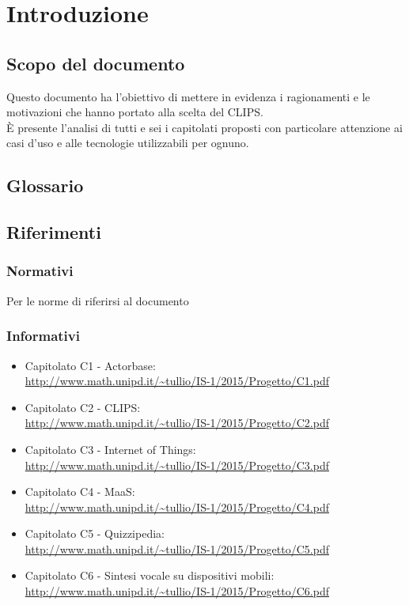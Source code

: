 \section{Introduzione}
\subsection{Scopo del documento}

Questo documento ha l'obiettivo di mettere in evidenza i ragionamenti e le motivazioni che hanno portato alla scelta del  CLIPS.\\
È presente l'analisi di tutti e sei i capitolati proposti con particolare attenzione ai casi d'uso e alle tecnologie utilizzabili per ognuno.

\subsection{Glossario}
\GLOSSARIO

\subsection{Riferimenti}
\subsubsection{Normativi}
Per le norme di  riferirsi al documento \NPdoc
\subsubsection{Informativi}
\begin{itemize}
	\item Capitolato C1 - Actorbase: \\ \url{http://www.math.unipd.it/~tullio/IS-1/2015/Progetto/C1.pdf}
	\item Capitolato C2 - CLIPS: \\ \url{http://www.math.unipd.it/~tullio/IS-1/2015/Progetto/C2.pdf}
	\item Capitolato C3 - Internet of Things: \\ \url{http://www.math.unipd.it/~tullio/IS-1/2015/Progetto/C3.pdf}
	\item Capitolato C4 - MaaS: \\ \url{http://www.math.unipd.it/~tullio/IS-1/2015/Progetto/C4.pdf}
	\item Capitolato C5 - Quizzipedia: \\ \url{http://www.math.unipd.it/~tullio/IS-1/2015/Progetto/C5.pdf}
	\item Capitolato C6 - Sintesi vocale su dispositivi mobili: \\ \url{http://www.math.unipd.it/~tullio/IS-1/2015/Progetto/C6.pdf}
\end{itemize}